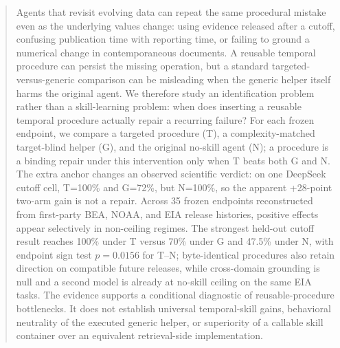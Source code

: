 \begin{abstract}
Agents that revisit evolving data can repeat the same procedural mistake even as the underlying values change: using evidence released after a cutoff, confusing publication time with reporting time, or failing to ground a numerical change in contemporaneous documents. A reusable temporal procedure can persist the missing operation, but a standard targeted-versus-generic comparison can be misleading when the generic helper itself harms the original agent. We therefore study an identification problem rather than a skill-learning problem: when does inserting a reusable temporal procedure actually repair a recurring failure? For each frozen endpoint, we compare a targeted procedure (T), a complexity-matched target-blind helper (G), and the original no-skill agent (N); a procedure is a binding repair under this intervention only when T beats both G and N. The extra anchor changes an observed scientific verdict: on one DeepSeek cutoff cell, T=100\% and G=72\%, but N=100\%, so the apparent +28-point two-arm gain is not a repair. Across 35 frozen endpoints reconstructed from first-party BEA, NOAA, and EIA release histories, positive effects appear selectively in non-ceiling regimes. The strongest held-out cutoff result reaches 100\% under T versus 70\% under G and 47.5\% under N, with endpoint sign test $p=0.0156$ for T--N; byte-identical procedures also retain direction on compatible future releases, while cross-domain grounding is null and a second model is already at no-skill ceiling on the same EIA tasks. The evidence supports a conditional diagnostic of reusable-procedure bottlenecks. It does not establish universal temporal-skill gains, behavioral neutrality of the executed generic helper, or superiority of a callable skill container over an equivalent retrieval-side implementation.
\end{abstract}
